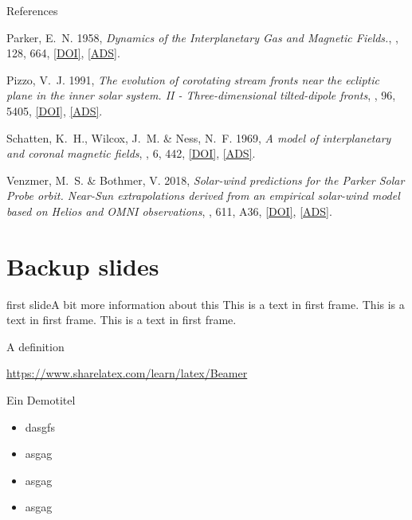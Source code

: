\documentclass[11pt,aspectratio=1610]{beamer}	%
\begin{document}
\begin{frame}[allowframebreaks]{References}
\begin{thebibliography}{10}
			{Parker}, E.~N. 1958, \emph{{Dynamics of the Interplanetary Gas and Magnetic Fields.}}, \apj, 128, 664, \href{http://dx.doi.org/10.1086/146579}{[DOI]}, \href{http://adsabs.harvard.edu/abs/1958ApJ...128..664P}{[ADS]}.

			{Pizzo}, V.~J. 1991, \emph{{The evolution of corotating stream fronts near the
			ecliptic plane in the inner solar system. II - Three-dimensional
			tilted-dipole fronts}}, \jgr, 96, 5405,
			\href{http://dx.doi.org/10.1029/91JA00155}{[DOI]},
			\href{http://adsabs.harvard.edu/abs/1991JGR....96.5405P}{[ADS]}.
			
			{Schatten}, K.~H., {Wilcox}, J.~M. \& {Ness}, N.~F. 1969, \emph{{A model of
			interplanetary and coronal magnetic fields}}, \solphys, 6, 442,
			\href{http://dx.doi.org/10.1007/BF00146478}{[DOI]},
			\href{http://adsabs.harvard.edu/abs/1969SoPh....6..442S}{[ADS]}.

			{Venzmer}, M.~S. \& {Bothmer}, V. 2018, \emph{{Solar-wind predictions for the
			Parker Solar Probe orbit. Near-Sun extrapolations derived from an empirical
			solar-wind model based on Helios and OMNI observations}}, \aap, 611, A36,
			\href{http://dx.doi.org/10.1051/0004-6361/201731831}{[DOI]},
			\href{http://adsabs.harvard.edu/abs/2018A\%26A...611A..36V}{[ADS]}.

	\end{thebibliography}
\end{frame}


\appendix

\section{Backup slides}

\begin{frame}[c]{first slide}{A bit more information about this}
	This is a text in first frame. \pause This is a text in first frame. This is a text in first frame.
	\begin{definition}
		A definition
	\end{definition}
	\url{https://www.sharelatex.com/learn/latex/Beamer}
\end{frame}

\begin{frame}[<+->]{Ein Demotitel}{}
	\begin{itemize}
		\item<1-> dasgfs
		\item<2> asgag
		\item<3-> asgag
		\item asgag
	\end{itemize}
\end{frame}
\end{document}
